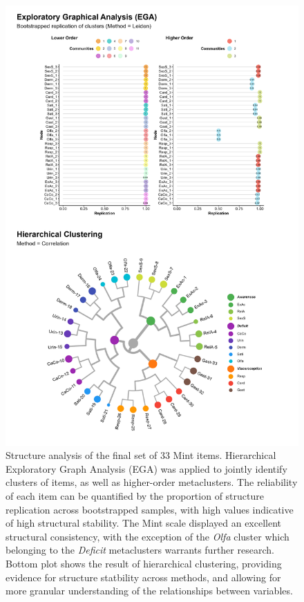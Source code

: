 \documentclass[
  jou,
  floatsintext,
  longtable,
  nolmodern,
  notxfonts,
  notimes,
  colorlinks=true,linkcolor=blue,citecolor=blue,urlcolor=blue]{apa7}
\begin{document}
\begin{figure}[!htbp]

{\caption{{Structure analysis of the final set of 33 Mint items.
Hierarchical Exploratory Graph Analysis (EGA) was applied to jointly
identify clusters of items, as well as higher-order metaclusters. The
reliability of each item can be quantified by the proportion of
structure replication across bootstrapped samples, with high values
indicative of high structural stability. The Mint scale displayed an
excellent structural consistency, with the exception of the \emph{Olfa}
cluster which belonging to the \emph{Deficit} metaclusters warrants
further research. Bottom plot shows the result of hierarchical
clustering, providing evidence for structure statbility across methods,
and allowing for more granular understanding of the relationships
between variables.}{\label{fig-two}}}}

\begin{center}
\includegraphics[width=0.8\linewidth,height=\textheight,keepaspectratio]{../study2/analysis/figures/fig1.png}
\end{center}

\end{figure}
\end{document}
